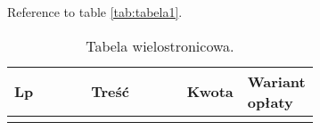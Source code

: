 Reference to table \ref{tab:tabela1}. \kant[2]

\begin{longtable}{| c | m{0.58\linewidth} | r | m{0.1\linewidth} |}
    \caption{Tabela wielostronicowa.}
    \label{table:koszty}                                                                                                                                                                                               \\

    \hline
    Lp & \multicolumn{1}{c|}{Treść}                                                                                                  & \multicolumn{1}{c|}{Kwota} & \multicolumn{1}{m{0.1\linewidth}|}{Wariant opłaty} \\ \hline\hline \endfirsthead

    \endfoot
    \hline \endlastfoot


\end{longtable}
